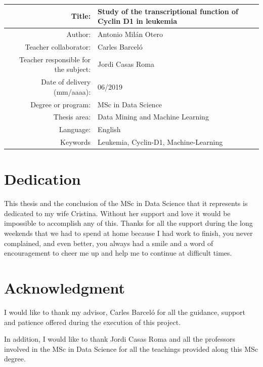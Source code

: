 \begin{table}[ht]
	\centering{}
	\renewcommand{\arraystretch}{2}
	\begin{tabular}{r | p{8cm}}
		\hline
		Title: & Study of the transcriptional function \newline of Cyclin D1 in leukemia\\
		\hline
        Author: & Antonio Milán Otero\\
		\hline
        Teacher collaborator: & Carles Barceló\\
		\hline
        Teacher responsible for the subject: & Jordi Casas Roma\\
		\hline
        Date of delivery (mm/aaaa): & 06/2019\\
		\hline
        Degree or program: & MSc in Data Science\\
		\hline
        Thesis area: & Data Mining and Machine Learning\\
		\hline
        Language: & English\\
		\hline
        Keywords & Leukemia, Cyclin-D1, Machine-Learning\\
		\hline
	\end{tabular}
\end{table}

\chapter*{Dedication}

This thesis and the conclusion of the MSc in Data Science that it represents is dedicated to my wife Cristina. Without her support and love it would be impossible to accomplish any of this. Thanks for all the support during the long weekends that we had to spend at home because I had work to finish, you never complained, and even better, you always had a smile and a word of encouragement to cheer me up and help me to continue at difficult times.

\chapter*{Acknowledgment}

I would like to thank my advisor, Carles Barceló for all the guidance, support and patience offered during the execution of this project.

In addition, I would like to thank Jordi Casas Roma and all the professors involved in the MSc in Data Science for all the teachings provided along this MSc degree.

